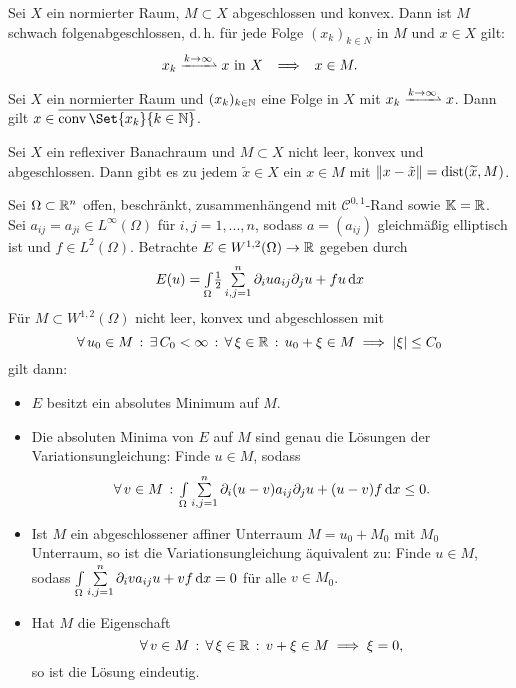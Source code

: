 \documentclass{cheat-sheet}
\newcommand{\K}{\mathbb{K}}
\newcommand{\conv}{\mathop{\mathrm{conv}}} %
\newcommand{\convWeaklyWith}[1]{\xrightharpoonup{#1 \to \infty}} %
\begin{document}

\begin{satz}
  Sei $X$ ein normierter Raum, $M \subset X$ abgeschlossen und konvex. Dann ist $M$ schwach folgenabgeschlossen, d.\,h. für jede Folge $(x_k)_{k \in N}$ in $M$ und $x \in X$ gilt:
  \[ x_k \convWeaklyWith{k} x \text{ in } X \enspace \implies \enspace x \in M. \]
\end{satz}

\begin{lem}[Mazur]
  Sei $X$ ein normierter Raum und $(x_k)_{k \in \mathbb{N}}$ eine Folge in $X$ mit $x_k \convWeaklyWith{k} x$. Dann gilt $x \in \overline{\conv \Set{ x_k }{ k \in \N }}$.
\end{lem}

\begin{satz}
  Sei $X$ ein reflexiver Banachraum und $M \subset X$ nicht leer, konvex und abgeschlossen. Dann gibt es zu jedem $\widetilde{x} \in X$ ein $x \in M$ mit $\lVert x - \tilde{x}\rVert = \mathrm{dist}(\widetilde{x}, M)$.
\end{satz}


\begin{satz}

  Sei $\Omega \subset \mathbb{R}^n$ offen, beschränkt, zusammenhängend mit $\mathcal{C}^{0,1}$-Rand sowie $\K = \R$. Sei $a_{ij} = a_{ji} \in L^\infty(\Omega)$ für $i,j = 1, ..., n$, sodass $a = (a_{ij})$ gleichmäßig elliptisch ist und $f \in L^2(\Omega)$. Betrachte $E \in W^{1,2}(\Omega) \to \mathbb{R}$ gegeben durch
  \[
    E(u) = \Int{\Omega}{}{ \tfrac{1}{2} \sum_{i,j=1}^n \partial_i u a_{ij} \partial_j u + f u }{x}
  \]
  Für $M \subset W^{1,2}(\Omega)$ nicht leer, konvex und abgeschlossen mit
  \[ \forall \, {u_0 \in M} \,:\, \exists \, {C_0 < \infty} \,:\, \forall \, {\xi \in \mathbb{R}} \,:\, u_0 + \xi \in M \implies \lvert\xi\rvert \leq C_0 \]
  gilt dann: %
  \begin{itemize}
    \item $E$ besitzt ein absolutes Minimum auf $M$.
    \item Die absoluten Minima von $E$ auf $M$ sind genau die Lösungen der Variationsungleichung: Finde $u \in M$, sodass
    \[ \fa{v \in M} \Int{\Omega}{}{\sum_{i,j=1}^n \partial_i (u-v) a_{ij} \partial_j u + (u-v) f}{x} \leq 0. \]
    \item Ist $M$ ein abgeschlossener affiner Unterraum $M = u_0 + M_0$ mit $M_0$ Unterraum, so ist die Variationsungleichung äquivalent zu: Finde $u \in M$, sodass $\Int{\Omega}{}{\sum_{i,j=1}^n \partial_i v a_{ij} u + v f}{x} = 0$ für alle $v \in M_0$.
    \item Hat $M$ die Eigenschaft
    \[ \forall \, {v \in M} \,:\, \forall \, {\xi \in \mathbb{R}} \,:\, v + \xi \in M \implies \xi = 0, \]
    so ist die Lösung eindeutig.
  \end{itemize}
\end{satz}
\end{document}
